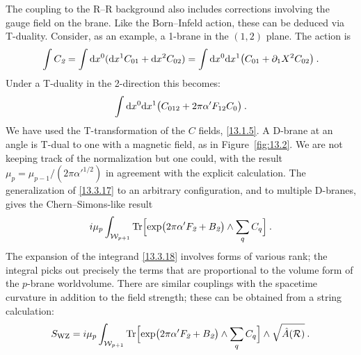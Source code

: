 The coupling to the R--R background also includes corrections involving the gauge field on the brane. Like the Born--Infeld action, these can be deduced via T-duality. Consider, as an example, a 1-brane in the $(1,2)$ plane. The action is
\begin{equation}
	\int C_{\textit{2}} = \int \mathrm{d} x^0(\mathrm{d} x^1 C_{01} + \mathrm{d} x^2 C_{02}) = \int \mathrm{d} x^0\mathrm{d} x^1\bigl(C_{01} + \partial_1 X^2 C_{02}\bigr) \:. \label{13.3.16}
\end{equation}
Under a T-duality in the 2-direction this becomes:
\begin{equation}
	\int \mathrm{d} x^0\mathrm{d} x^1\bigl(C_{012} + 2\pi\alpha' F_{12}C_0\bigr) \:. \label{13.3.17}
\end{equation}
We have used the T-transformation of the $C$ fields, \eqref{13.1.5}. A D-brane at an angle is T-dual to one with a magnetic field, as in Figure~\ref{fig:13.2}. We are not keeping track of the normalization but one could, with the result $\mu_p = \mu_{p-1}/(2\pi{\alpha'}^{1/2})$ in agreement with the explicit calculation. The generalization of \eqref{13.3.17} to an arbitrary configuration, and to multiple D-branes, gives the Chern--Simons-like result
\begin{equation}
	i\mu_p\int_{\mathcal{W}_{p+1}}\operatorname{Tr}\Bigl[\exp\bigl(2\pi\alpha' F_{\textit{2}} + B_{\textit{2}}\bigr)\wedge \sum_{q}C_q\Bigr] \:. \label{13.3.18}
\end{equation}
The expansion of the integrand \eqref{13.3.18} involves forms of various rank; the integral picks out precisely the terms that are proportional to the volume form of the $p$-brane worldvolume. There are similar couplings with the spacetime curvature in addition to the field strength; these can be obtained from a string calculation:
\[
S_{\mathrm{WZ}} = i\mu_p\int_{\mathcal{W}_{p+1}}\operatorname{Tr}\Bigl[\exp\bigl(2\pi\alpha' F_{\textit{2}} + B_{\textit{2}}\bigr)\wedge \sum_{q}C_q\Bigr]\wedge \sqrt{\hat{A}(\mathcal{R})} \:.
\]
